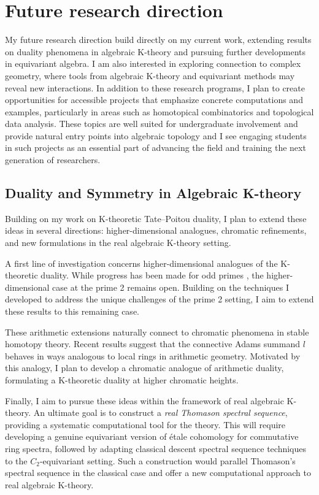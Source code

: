\documentclass[11pt]{article}
\begin{document}
\section{Future research direction}
My future research direction build directly on my current work, extending results on duality phenomena in algebraic K-theory and pursuing further developments in equivariant algebra.
I am also interested in exploring connection to complex geometry, where tools from algebraic K-theory and equivariant methods may reveal new interactions.
In addition to these research programs, I plan to create opportunities for accessible projects that emphasize concrete computations and examples, particularly in areas such as homotopical combinatorics and topological data analysis.
These topics are well suited for undergraduate involvement and provide natural entry points into algebraic topology and I see engaging students in such projects as an essential part of advancing the field and training the next generation of researchers.

\subsection*{Duality and Symmetry in Algebraic K-theory}
Building on my work on K-theoretic Tate–Poitou duality, I plan to extend these ideas in several directions: higher-dimensional analogues, chromatic refinements, and new formulations in the real algebraic K-theory setting.

A first line of investigation concerns higher-dimensional analogues of the K-theoretic duality.
While progress has been made for odd primes \cite{Braunling}, the higher-dimensional case at the prime 2 remains open.
Building on the techniques I developed to address the unique challenges of the prime 2 setting, I aim to extend these results to this remaining case.

These arithmetic extensions naturally connect to chromatic phenomena in stable homotopy theory.
Recent results \cite{HRW} suggest that the connective Adams summand $l$ behaves in ways analogous to local rings in arithmetic geometry.
Motivated by this analogy, I plan to develop a chromatic analogue of arithmetic duality, formulating a K-theoretic duality at higher chromatic heights.

Finally, I aim to pursue these ideas within the framework of real algebraic K-theory.
An ultimate goal is to construct a {\it real Thomason spectral sequence}, providing a systematic computational tool for the theory.
This will require developing a genuine equivariant version of \'etale cohomology for commutative ring spectra, followed by adapting classical descent spectral sequence techniques to the $C_2$-equivariant setting.
Such a construction would parallel Thomason’s spectral sequence in the classical case and offer a new computational approach to real algebraic K-theory.
\end{document}
